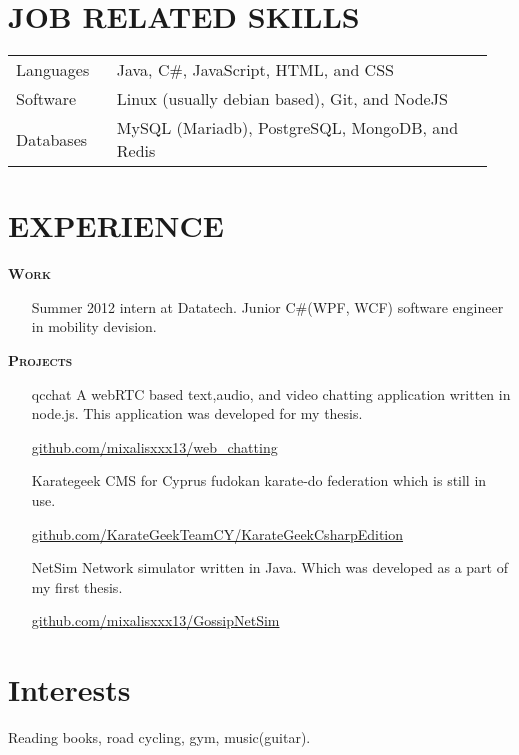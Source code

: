 \documentclass[margin, 10pt]{res} %
\begin{document}
\begin{resume}
\section{JOB RELATED SKILLS}

\begin{tabular}{p{0.2\linewidth} p{0.75\linewidth}}

Languages & Java, C\#, JavaScript, HTML, and CSS				\\
Software & Linux (usually debian based), Git, and NodeJS 				\\
Databases & MySQL (Mariadb), PostgreSQL, MongoDB, and Redis 	

\end{tabular} 
 
 
 
\section{EXPERIENCE} 

\textsc{ \textbf{Work}}

\begin{itemize}
\item[Summer 2012 intern] at Datatech. Junior C\#(WPF, WCF) software engineer in mobility devision. 
\end{itemize}

\textsc{ \textbf{Projects}}

\begin{itemize}

\item[qcchat] A webRTC based text,audio, and video chatting application written in node.js.
This application was developed for my thesis.

\href{https://github.com/mixalisxxx13/web_chatting}{github.com/mixalisxxx13/web\_chatting} \\



\item[Karategeek] CMS for Cyprus fudokan karate-do federation which is still in use. 

\href{https://github.com/KarateGeekTeamCY/KarateGeekCsharpEdition/tree/baseV4.5.1}{github.com/KarateGeekTeamCY/KarateGeekCsharpEdition} \\



\item[NetSim] Network simulator written in Java. 
Which was developed as a part of my first thesis.

\href{https://github.com/mixalisxxx13/GossipNetSim}{github.com/mixalisxxx13/GossipNetSim} 

\end{itemize}


\section{Interests}

Reading books, road cycling, gym, music(guitar). 

 


\end{resume}
\end{document}
